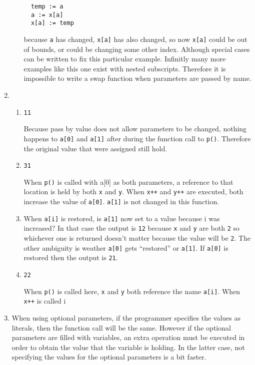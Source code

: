 \begin{enumerate}
\begin{enumerate}
{\begin{verbatim}
  temp := a
  a := x[a]
  x[a] := temp
\end{verbatim}

}

  because {\tt a} has changed, {\tt x[a]} has also changed, so now {\tt x[a]} could be out of
  bounds, or could be changing some other index.  Although special cases can be written to
  fix this particular example.  Infinitly many more examples like this one exist with nested
  subscripts.  Therefore it is impossible to write a swap function when parameters are passed
  by name.
\end{enumerate}

\item %

\begin{enumerate}
\item {\tt 11}

  Because pass by value does not allow parameters to be changed, nothing happens to {\tt a[0]}
  and {\tt a[1]} after during the function call to {\tt p()}.  Therefore the original value that
  were assigned still hold.

\item {\tt 31}
  
  When {\tt p()} is called with a[0] as both parameters, a reference to that location is held by
  both {\tt x} and {\tt y}.  When {\tt x++} and {\tt y++} are executed, both increase the value
  of {\tt a[0]}.  {\tt a[1]} is not changed in this function.

\item
  
  When {\tt a[i]} is restored, is {\tt a[1]} now set to a value because i was increased?  In
  that case the output is {\tt 12} because {\tt x} and {\tt y} are both {\tt 2} so whichever one
  is returned doesn't matter because the value will be {\tt 2}.  The other ambiguity is weather
  {\tt a[0]} gets ``restored'' or {\tt a[1]}.  If {\tt a[0]} is restored then the output is
  {\tt 21}.

\item {\tt 22}

  When {\tt p()} is called here, {\tt x} and {\tt y} both reference the name {\tt a[i]}.  When
  {\tt x++} is called i

\end{enumerate}

\item %

When using optional parameters, if the programmer specifies the values as literals, then the
function call will be the same.  However if the optional parameters are filled with variables,
an extra operation must be executed in order to obtain the value that the variable is holding.
In the latter case, not specifying the values for the optional parameters is a bit faster.

\end{enumerate}
